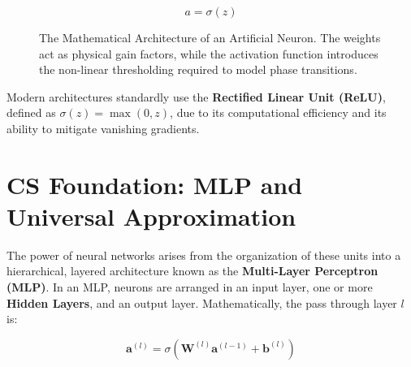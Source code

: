 \begin{equation}
a = \sigma(z)
\end{equation}

\begin{figure}[H]
\centering
{}
\caption{The Mathematical Architecture of an Artificial Neuron. The weights act as physical gain factors, while the activation function introduces the non-linear thresholding required to model phase transitions.}
\label{fig:neuron_tikz}
\end{figure}

Modern architectures standardly use the \textbf{Rectified Linear Unit (ReLU)}, defined as $\sigma(z) = \max(0, z)$, due to its computational efficiency and its ability to mitigate vanishing gradients. 

\section{CS Foundation: MLP and Universal Approximation}

The power of neural networks arises from the organization of these units into a hierarchical, layered architecture known as the \textbf{Multi-Layer Perceptron (MLP)}. In an MLP, neurons are arranged in an input layer, one or more \textbf{Hidden Layers}, and an output layer. Mathematically, the pass through layer $l$ is:

\begin{equation}
\mathbf{a}^{(l)} = \sigma(\mathbf{W}^{(l)} \mathbf{a}^{(l-1)} + \mathbf{b}^{(l)})
\end{equation}

